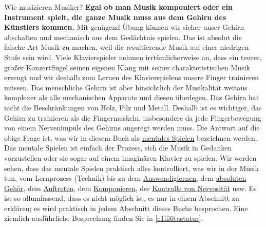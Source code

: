 Wie musizieren Musiker?
\textbf{Egal ob man Musik komponiert oder ein Instrument spielt, die ganze Musik muss aus dem Gehirn des Künstlers kommen.}
Mit genügend Übung können wir sicher unser Gehirn abschalten und mechanisch aus dem Gedächtnis spielen.
Das ist absolut die falsche Art Musik zu machen, weil die resultierende Musik auf einer niedrigen Stufe sein wird.
Viele Klavierspieler nehmen irrtümlicherweise an, dass ein teurer, großer Konzertflügel seinen eigenen Klang mit seiner charakteristischen Musik erzeugt und wir deshalb zum Lernen des Klavierspielens unsere Finger trainieren müssen.
Das menschliche Gehirn ist aber hinsichtlich der Musikalität weitaus komplexer als alle mechanischen Apparate und diesen überlegen.
Das Gehirn hat nicht die Beschränkungen von Holz, Filz und Metall.
Deshalb ist es wichtiger, das Gehirn zu trainieren als die Fingermuskeln, insbesondere da jede Fingerbewegung von einem Nervenimpuls des Gehirns angeregt werden muss.
Die Antwort auf die obige Frage ist, was wir in diesem Buch als \hyperref[c1ii12mental]{mentales Spielen} bezeichnen werden.
Das mentale Spielen ist einfach der Prozess, sich die Musik in Gedanken vorzustellen oder sie sogar auf einem imaginären Klavier zu spielen.
Wir werden sehen, dass das mentale Spielen praktisch alles kontrolliert, was wir in der Musik tun, vom Lernprozess (Technik) bis zu dem \hyperref[c1iii6]{Auswendiglernen}, dem \hyperref[c1iii12]{absoluten Gehör}, dem \hyperref[c1iii14]{Auftreten}, dem \hyperref[c1iii12blatt]{Komponieren}, der \hyperref[c1iii15]{Kontrolle von Nervosität} usw.
Es ist so allumfassend, dass es nicht möglich ist, es nur in einem Abschnitt zu erklären; es wird praktisch in jedem Abschnitt dieses Buchs besprochen.
Eine ziemlich ausführliche Besprechung finden Sie in \hyperref[c1iii6tastatur]{\autoref{c1iii6tastatur}}.

